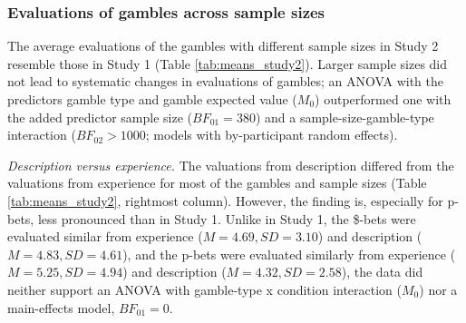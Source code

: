 \documentclass[a4paper, man, floatsintext]{apa6}
\title{}
\author{Jana B. Jarecki}
\date{27 November, 2019}
\begin{document}
\subsubsection{Evaluations of gambles across sample sizes}

The average evaluations of the gambles with different sample sizes in
Study 2 resemble those in Study 1 (Table \ref{tab:means_study2}). Larger
sample sizes did not lead to systematic changes in evaluations of
gambles; an ANOVA with the predictors gamble type and gamble expected
value (\(M_0\)) outperformed one with the added predictor sample size
(\(BF_{01} = 380\)) and a sample-size-gamble-type interaction
(\(BF_{02} > 1000\); models with by-participant random effects).

\textit{Description versus experience.} The valuations from description
differed from the valuations from experience for most of the gambles and
sample sizes (Table \ref{tab:means_study2}, rightmost column). However,
the finding is, especially for p-bets, less pronounced than in Study 1.
Unlike in Study 1, the \$-bets were evaluated similar from experience
(\(M=4.69, SD=3.10\)) and description (\(M=4.83, SD=4.61\)), and the
p-bets were evaluated similarly from experience (\(M=5.25, SD=4.94\))
and description (\(M=4.32, SD=2.58\)), the data did neither support an
ANOVA with gamble-type x condition interaction (\(M_0\)) nor a
main-effects model, \(BF_{01} = 0\).
\end{document}
